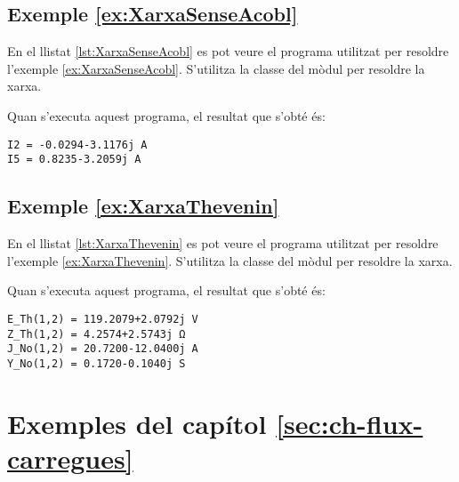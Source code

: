 \hypertarget{exemple:XarxaSenseAcobl}{\subsection{Exemple \ref*{ex:XarxaSenseAcobl} \XarxaSenseAcobl}}
En el llistat \vref{lst:XarxaSenseAcobl} es pot veure el programa utilitzat per resoldre l'exemple \vref{ex:XarxaSenseAcobl}. S'utilitza la classe  del mòdul  per resoldre la xarxa.


Quan s'executa aquest programa, el resultat que s'obté és:
\lstset{
	language=,
	numbers=none,
	frame=none
}
\begin{lstlisting}
I2 = -0.0294-3.1176j A
I5 = 0.8235-3.2059j A
\end{lstlisting} 

\hypertarget{exemple:XarxaThevenin}{\subsection{Exemple \ref*{ex:XarxaThevenin} \XarxaThevenin}}
En el llistat \vref{lst:XarxaThevenin} es pot veure el programa utilitzat per resoldre l'exemple \vref{ex:XarxaThevenin}. S'utilitza la classe  del mòdul  per resoldre la xarxa.


Quan s'executa aquest programa, el resultat que s'obté és:
\lstset{
	language=,
	numbers=none,
	frame=none
}
\begin{lstlisting}
E_Th(1,2) = 119.2079+2.0792j V
Z_Th(1,2) = 4.2574+2.5743j Ω
J_No(1,2) = 20.7200-12.0400j A
Y_No(1,2) = 0.1720-0.1040j S
\end{lstlisting} 



\section{Exemples del capítol \ref*{sec:ch-flux-carregues}}


